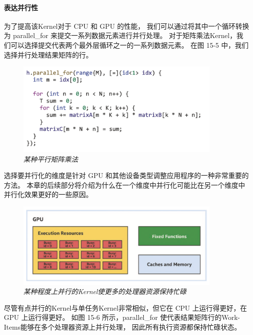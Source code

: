 \paragraph{表达并行性}

为了提高该Kernel对于 CPU 和 GPU 的性能，
我们可以通过将其中一个循环转换为 parallel\_for 来提交一系列数据元素进行并行处理。 
对于矩阵乘法Kernel，我们可以选择提交代表两个最外层循环之一的一系列数据元素。 
在图 15-5 中，我们选择并行处理结果矩阵的行。

\begin{figure}[H]
	\centering
	\includegraphics[width=0.9\textwidth]{figs/F15.5.png}
	\caption{\textit{某种平行矩阵乘法 }}
\end{figure}

\begin{remark}[选择如何并行化]
选择要并行化的维度是针对 GPU 和其他设备类型调整应用程序的一种非常重要的方法。
本章的后续部分将介绍为什么在一个维度中并行化可能比在另一个维度中并行化效果更好的一些原因。
\end{remark}

\begin{figure}[H]
	\centering
	\includegraphics[width=0.9\textwidth]{figs/F15.6.png}
	\caption{\textit{某种程度上并行的Kernel使更多的处理器资源保持忙碌 }}
\end{figure}

尽管有点并行的Kernel与单任务Kernel非常相似，但它在 CPU 上运行得更好，在 GPU 上运行得更好。 
如图 15-6 所示，parallel\_for 使代表结果矩阵行的Work-Items能够在多个处理器资源上并行处理，
因此所有执行资源都保持忙碌状态。


